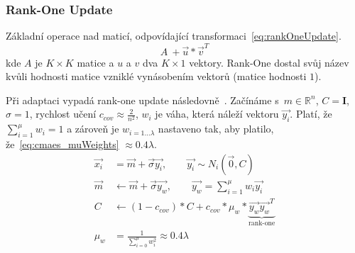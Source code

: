 \subsubsection{Rank-One Update}
Základní operace nad maticí, odpovídající transformaci~\ref{eq:rankOneUpdate}. 
\begin{equation}
    A~+ \Vec{u}*\Vec{v}^T
    \label{eq:rankOneUpdate}
\end{equation}
kde $A$ je $K \times K$ matice a $u$ a $v$ dva $K \times 1$ vektory. Rank-One dostal svůj název kvůli hodnosti matice vzniklé vynásobením vektorů (matice hodnosti $1$).

Při adaptaci vypadá rank-one update následovně~\cite{CMAES}. Začínáme s~$m \in \mathbb{R}^n$, $C = \textbf{I}$, $\sigma = 1$, rychlost učení $c_{cov} \approx \frac{2}{n^2}$, $w_i$ je váha, která náleží vektoru $\Vec{y_i}$. Platí, že $\sum_{i=1}^{\mu}w_i = 1 $ a zároveň je $w_{i=1 \dots \lambda}$ nastaveno tak, aby platilo, že~\ref{eq:cmaes_muWeights} $\approx 0.4\lambda$. 
    \begin{subequations}
    \label{eq:cmaes}
    \begin{align}
        \Vec{x_i} &= \Vec{m} + \Vec{\sigma} \Vec{y_i}, \qquad \Vec{y_i} \sim N_i(\Vec{0}, C)  \label{eq:cmaes_sampling}\\
        \Vec{m} &\leftarrow \Vec{m} + \Vec{\sigma} \Vec{y_w}, \qquad \Vec{y_w} = \sum_{i=1}^{\mu}w_i\Vec{y_i} \label{eq:cmaes_mean}\\ 
        C &\leftarrow (1 - c_{cov})*C + c_{cov}* \mu_{w} * \underbrace{\Vec{y_{w}}\Vec{y_{w}}^{T}}_\text{rank-one}  \label{eq:cmaes_cUpdate} \\
        \mu_{w} &= \frac{1}{\sum_{i=0}^{\mu}w_{i}^{2}} \approx 0.4\lambda \label{eq:cmaes_muWeights} 
    \end{align}
    \label{eq:rankOne1}
    \end{subequations} 

